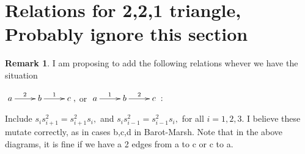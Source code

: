 \documentclass[11pt]{amsart}
\theoremstyle{definition}
\newtheorem{rem}[thm]{Remark}
\begin{document}
\section{Relations for 2,2,1 triangle, Probably ignore this section}

\begin{rem}
\label{even_more_relations}
I am proposing to add the following relations whever we have the situation

$\xymatrix{a \ar[r]^2 & b \ar[r]^1 & c},$ or $\xymatrix{a \ar[r]^1 & b \ar[r]^2 & c}:$

Include $s_is_{i+1}^2 = s_{i+1}^2s_i,$ and $s_is_{i-1}^2 = s_{i-1}^2s_i,$ for all $i = 1,2,3.$ I believe these mutate correctly, as in cases b,c,d in Barot-Marsh. Note that in the above diagrams, it is fine if we have a 2 edges from a to c or c to a.
\end{rem}
\end{document}
